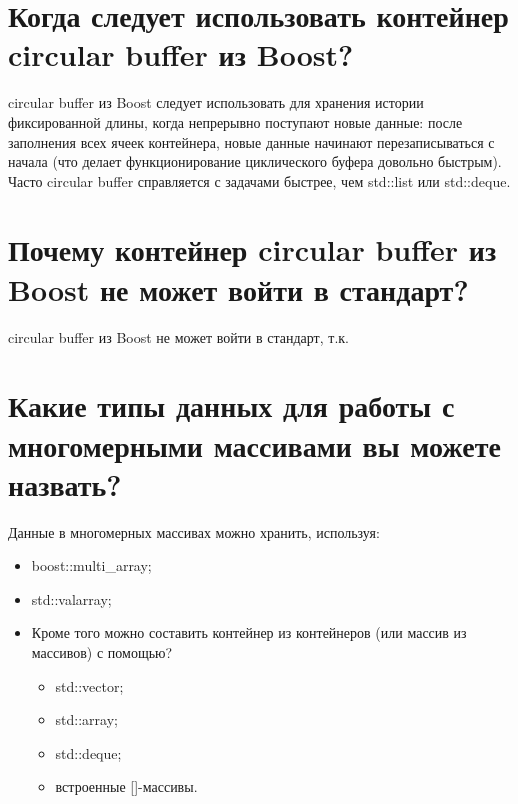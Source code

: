 \documentclass[a4paper,12pt]{article}	%
\begin{document}
\section{Когда следует использовать контейнер circular buffer из Boost?}

	circular buffer из Boost следует использовать для хранения истории фиксированной длины, когда непрерывно поступают новые данные: после заполнения всех ячеек контейнера, новые данные начинают перезаписываться с начала (что делает функционирование циклического буфера довольно быстрым). Часто circular buffer справляется с задачами быстрее, чем std::list или std::deque.

\section{Почему контейнер circular buffer из Boost не может войти в стандарт?}

	circular buffer из Boost не может войти в стандарт, т.к. 

\section{Какие типы данных для работы с многомерными массивами вы можете назвать?}

	Данные в многомерных массивах можно хранить, используя:
	
	\begin{itemize}
	
		\item boost::multi\_array;
		
		\item std::valarray;
		
		\item Кроме того можно составить контейнер из контейнеров (или массив из массивов) с помощью?
		
		\begin{itemize}
		
			\item std::vector;
		
			\item std::array;
		
			\item std::deque;	
			
			\item встроенные []-массивы.

		\end{itemize}	
	\end{itemize}
	
\end{document}
